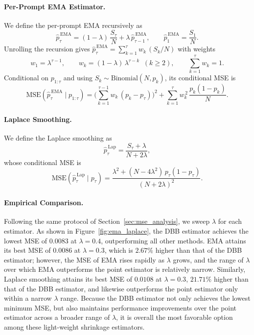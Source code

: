 \paragraph{Per-Prompt EMA Estimator.}
We define the per-prompt EMA recursively as
\begin{equation}
\hat{p}_\tau^{\,\mathrm{EMA}}
= (1-\lambda)\,\frac{S_\tau}{N} + \lambda\,\hat{p}_{\tau-1}^{\,\mathrm{EMA}},
\qquad
\hat{p}_1^{\,\mathrm{EMA}} = \frac{S_1}{N}.
\end{equation}
Unrolling the recursion gives $\hat{p}_\tau^{\,\mathrm{EMA}} = \sum_{k=1}^{\tau} w_k\,(S_k/N)$ with weights
\begin{equation}
w_1 = \lambda^{\tau-1},
\qquad
w_k = (1-\lambda)\,\lambda^{\tau-k} \;\; (k \ge 2),
\qquad
\sum_{k=1}^{\tau} w_k = 1.
\end{equation}
Conditional on $p_{1:\tau}$ and using $S_k\sim\mathrm{Binomial}(N,p_k)$, its conditional MSE is
\begin{equation}
\mathrm{MSE}\!\left(\hat{p}_\tau^{\,\mathrm{EMA}}\mid p_{1:\tau}\right)
=
\Bigg(\sum_{k=1}^{\tau-1} w_k\,(p_k-p_\tau)\Bigg)^{2}
+
\sum_{k=1}^{\tau} w_k^{\,2}\,\frac{p_k(1-p_k)}{N}.
\end{equation}

\paragraph{Laplace Smoothing.}
We define the Laplace smoothing as
\begin{equation}
\hat{p}_\tau^{\,\mathrm{Lap}}
=
\frac{S_\tau + \lambda}{N + 2\lambda},
\end{equation}
whose conditional MSE is
\begin{equation}
\mathrm{MSE}\!\left(\hat{p}_\tau^{\,\mathrm{Lap}}\mid p_\tau\right)
=
\frac{\lambda^{2} + (N - 4\lambda^{2})\,p_\tau(1-p_\tau)}{(N+2\lambda)^{2}}.
\end{equation}

\paragraph{Empirical Comparison.}
Following the same protocol of Section~\ref{sec:mse_analysis}, we sweep $\lambda$ for each estimator.
As shown in Figure~\ref{fig:ema_laplace}, the DBB estimator achieves the lowest MSE of $0.0083$ at $\lambda=0.4$, outperforming all other methods.
EMA attains its best MSE of $0.0086$ at $\lambda=0.3$, which is $2.67\%$ higher than that of the DBB estimator; however, the MSE of EMA rises rapidly as $\lambda$ grows, and the range of $\lambda$ over which EMA outperforms the point estimator is relatively narrow.
Similarly, Laplace smoothing attains its best MSE of $0.0108$ at $\lambda=0.3$, $21.71\%$ higher than that of the DBB estimator, and likewise outperforms the point estimator only within a narrow $\lambda$ range.
Because the DBB estimator not only achieves the lowest minimum MSE, but also maintains performance improvements over the point estimator across a broader range of $\lambda$, it is overall the most favorable option among these light-weight shrinkage estimators.


